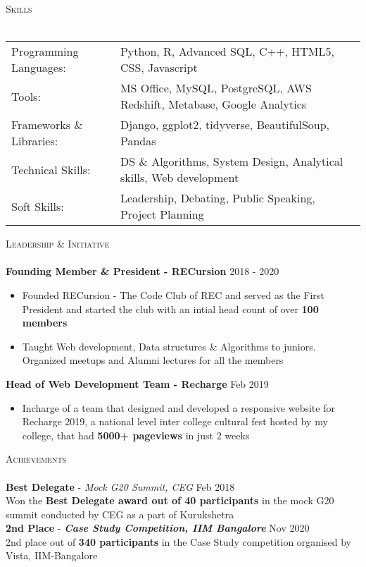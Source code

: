 \documentclass[a4paper]{article}
\newcommand{\lineunder} {
    \vspace*{-8pt} \\
    \hspace*{-18pt} \hrulefill \\
}
\newcommand{\header} [1] {
    {\hspace*{-18pt}\vspace*{6pt} \textsc{#1}}
    \vspace*{-6pt} \lineunder
}
\begin{document}
\header{Skills}
\begin{tabular}{ l l }
    Programming Languages: & Python, R, Advanced SQL, C++, HTML5, CSS, Javascript\\
    Tools:                 & MS Office, MySQL, PostgreSQL, AWS Redshift, Metabase, Google Analytics\\
    Frameworks \& Libraries:& Django, ggplot2, tidyverse, BeautifulSoup, Pandas\\
    Technical Skills:      & DS \& Algorithms, System Design, Analytical skills, Web development\\
    Soft Skills:           & Leadership, Debating, Public Speaking, Project Planning\\
\end{tabular}
\vspace{2mm}

\header{Leadership \& Initiative}
{\textbf{Founding Member \& President - RECursion}} \hfill 2018 - 2020
\begin{itemize} \itemsep 0.5pt
     \item Founded RECursion - The Code Club of REC and served as the First President and started the club with an intial head count of over \textbf{100 members}
     \item Taught Web development, Data structures \& Algorithms to juniors. Organized meetups and Alumni lectures for all the members
\end{itemize}
{\textbf{Head of Web Development Team - Recharge}} \hfill Feb 2019
\begin{itemize} \itemsep 0.5pt
     \item Incharge of a team that designed and developed a responsive website for Recharge 2019, a national level inter college cultural fest hosted by my college, that had \textbf{5000+ pageviews} in just 2 weeks
\end{itemize}
\vspace*{2mm}

\header{Achievements}
{\textbf{Best Delegate}} - {\sl Mock G20 Summit, CEG} \hfill Feb 2018\\
Won the \textbf{Best Delegate award out of 40 participants} in the mock G20 summit conducted by CEG as a part of Kurukshetra\\
\vspace*{2mm}
{\textbf{2nd Place}} - {\sl \textbf{Case Study Competition, IIM Bangalore}} \hfill Nov 2020\\
2nd place out of \textbf{340 participants} in the Case Study competition organised by Vista, IIM-Bangalore\\
\vspace*{2mm}


\ 
\end{document}
